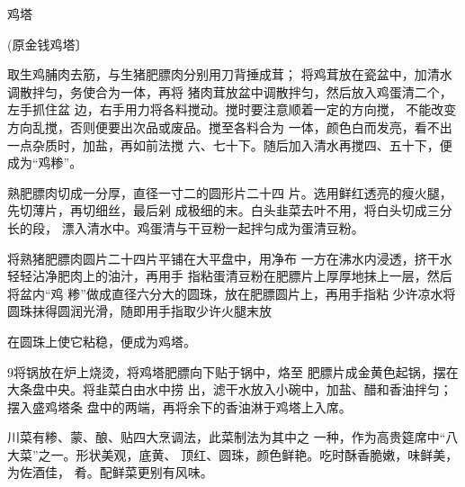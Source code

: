 \begin{recipe}{鸡塔}

(原金钱鸡塔〕

\ingredients



\cooking

\step 	取生鸡脯肉去筋，与生猪肥膘肉分别用刀背捶成茸； 将鸡茸放在瓷盆中，加清水调散拌匀，务使合为一体，再将 猪肉茸放盆中调散拌匀，然后放入鸡蛋清二个，左手抓住盆 边，右手用力将各料搅动。搅时要注意顺着一定的方向搅， 不能改变方向乱搅，否则便要出次品或废品。搅至各料合为 一体，颜色白而发亮，看不出一点杂质时，加盐，再如前法搅 六、七十下。随后加入清水再搅四、五十下，便成为“鸡糁”。

\step 	熟肥膘肉切成一分厚，直径一寸二的圆形片二十四 片。选用鲜红透亮的瘦火腿，先切薄片，再切细丝，最后剁 成极细的末。白头韭菜去叶不用，将白头切成三分长的段， 漂入清水中。鸡蛋清与干豆粉一起拌匀成为蛋清豆粉。

\step 	将熟猪肥膘肉圆片二十四片平铺在大平盘中，用净布 一方在沸水内浸透，挤干水轻轻沾净肥肉上的油汁，再用手 指粘蛋清豆粉在肥膘片上厚厚地抹上一层，然后将盆内“鸡 糁”做成直径六分大的圆珠，放在肥膘圆片上，再用手指粘 少许凉水将圆珠抹得圆润光滑，随即用手指取少许火腿末放

在圆珠上使它粘稳，便成为鸡塔。

\step 9将锅放在炉上烧烫，将鸡塔肥膘向下贴于锅中，烙至 肥膘片成金黄色起锅，摆在大条盘中央。将韭菜白由水中捞 出，滤干水放入小碗中，加盐、醋和香油拌匀；摆入盛鸡塔条 盘中的两端，再将余下的香油淋于鸡塔上入席。

\notes

川菜有糁、蒙、酿、贴四大烹调法，此菜制法为其中之 一种，作为高贵筵席中“八大菜”之一。形状美观，底黄、 顶红、圆珠，颜色鲜艳。吃时酥香脆嫩，味鲜美，为佐酒佳， 肴。配鲜菜更别有风味。

\end{recipe}

